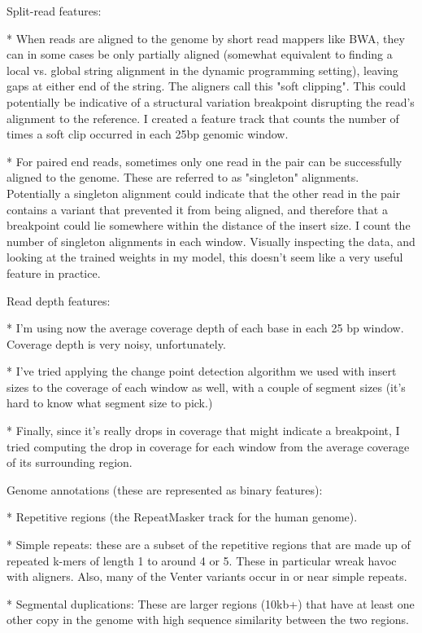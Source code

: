 Split-read features:

* When reads are aligned to the genome by short read mappers like BWA, they can in some cases be only partially aligned (somewhat equivalent to finding a local vs. global string alignment in the dynamic programming setting), leaving gaps at either end of the string. The aligners call this "soft clipping". This could potentially be indicative of a structural variation breakpoint disrupting the read's alignment to the reference. I created a feature track that counts the number of times a soft clip occurred in each 25bp genomic window.

* For paired end reads, sometimes only one read in the pair can be successfully aligned to the genome. These are referred to as "singleton" alignments. Potentially a singleton alignment could indicate that the other read in the pair contains a variant that prevented it from being aligned, and therefore that a breakpoint could lie somewhere within the distance of the insert size. I count the number of singleton alignments in each window. Visually inspecting the data, and looking at the trained weights in my model, this doesn't seem like a very useful feature in practice.

Read depth features:

* I'm using now the average coverage depth of each base in each 25 bp window. Coverage depth is very noisy, unfortunately.

* I've tried applying the change point detection algorithm we used with insert sizes to the coverage of each window as well, with a couple of segment sizes (it's hard to know what segment size to pick.)

* Finally, since it's really drops in coverage that might indicate a breakpoint, I tried computing the drop in coverage for each window from the average coverage of its surrounding region.

Genome annotations (these are represented as binary features):

* Repetitive regions (the RepeatMasker track for the human genome).

* Simple repeats: these are a subset of the repetitive regions that are made up of repeated k-mers of length 1 to around 4 or 5. These in particular wreak havoc with aligners. Also, many of the Venter variants occur in or near simple repeats.

* Segmental duplications: These are larger regions (10kb+) that have at least one other copy in the genome with high sequence similarity between the two regions.

